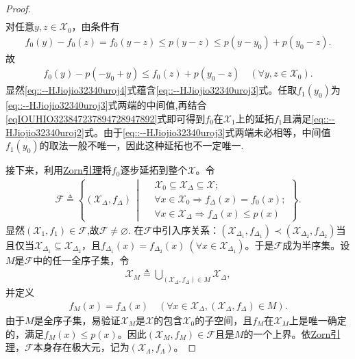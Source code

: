 \documentclass[../../main.tex]{subfiles}%
\begin{document}
\begin{proof}
\begin{align}
\end{align}
对任意$y, z \in \mathscr{X}_0$，由条件有
\begin{align*}
f_0(y) - f_0(z) = f_0(y - z) \leqslant p(y - z) 
\leqslant p(y - y_0) + p(y_0 - z).
\end{align*}
故
\begin{align}
f_0(y) - p(-y_0 + y) \leqslant f_0(z) + p(y_0 - z) \quad (\forall y, z \in \mathscr{X}_0). \label{eq::--HJiojio32340uroj4}
\end{align}
显然\eqref{eq::--HJiojio32340uroj4}式蕴含\eqref{eq::--HJiojio32340uroj3}式。任取$f_1(y_0)$为\eqref{eq::--HJiojio32340uroj3}式两端的中间值,再结合\eqref{eqIOUHIO323847237894728947892}式即可得到$f_0$在$\mathscr{X}_1$上的延拓$f_1$且满足\eqref{eq::--HJiojio32340uroj2}式。由于\eqref{eq::--HJiojio32340uroj3}式两端未必相等，中间值$f_1(y_0)$的取法一般不唯一，因此这种延拓也不一定唯一.

接下来，利用\hyperref[lemma:泛函分析--Zorn引理]{Zorn引理}将$f_0$逐步延拓到整个$\mathscr{X}$。令
\begin{align*}
\mathscr{F} \triangleq \left\{ (\mathscr{X}_\Delta, f_\Delta) \,\middle| \,
\begin{aligned}
&\mathscr{X}_0 \subseteq \mathscr{X}_\Delta \subseteq \mathscr{X}; \\
&\forall x \in \mathscr{X}_0 \Rightarrow f_\Delta(x) = f_0(x); \\
&\forall x \in \mathscr{X}_\Delta \Rightarrow f_\Delta(x) \leqslant p(x)
\end{aligned}
\right\}.
\end{align*}
显然$(\mathscr{X}_1,f_1)\in \mathscr{F}$,故$\mathscr{F}\neq \varnothing$.
在$\mathscr{F}$中引入序关系：$(\mathscr{X}_{\Delta_1}, f_{\Delta_1}) \prec (\mathscr{X}_{\Delta_2}, f_{\Delta_2})$当且仅当$\mathscr{X}_{\Delta_1} \subseteq \mathscr{X}_{\Delta_2}$，且$f_{\Delta_1}(x) = f_{\Delta_2}(x) \ (\forall x \in \mathscr{X}_{\Delta_1})$。于是$\mathscr{F}$成为半序集。设$M$是$\mathscr{F}$中的任一全序子集，令
\begin{align*}
\mathscr{X}_M \triangleq \bigcup_{(\mathscr{X}_\Delta, f_\Delta) \in M} \mathscr{X}_\Delta,
\end{align*}
并定义
\begin{align*}
f_M(x) = f_\Delta(x) \quad (\forall x \in \mathscr{X}_\Delta, (\mathscr{X}_\Delta, f_\Delta) \in M).
\end{align*}
由于$M$是全序子集，易验证$\mathscr{X}_M$是$\mathscr{X}$的包含$\mathscr{X}_0$的子空间，且$f_M$在$\mathscr{X}_M$上是唯一确定的，满足$f_M(x) \leqslant p(x)$。因此$(\mathscr{X}_M, f_M) \in \mathscr{F}$且是$M$的一个上界。依\hyperref[lemma:泛函分析--Zorn引理]{Zorn引理}，$\mathscr{F}$本身存在极大元，记为$(\mathscr{X}_\Lambda, f_\Lambda)$。


\end{proof}
\end{document}
